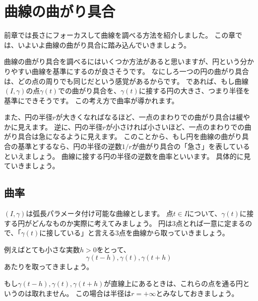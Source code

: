 \chapter{曲線の曲がり具合}

前章では長さにフォーカスして曲線を調べる方法を紹介しました。
この章では、いよいよ曲線の曲がり具合に踏み込んでいきましょう。

曲線の曲がり具合を調べるにはいくつか方法があると思いますが、円という分かりやすい曲線を基準にするのが良さそうです。
なにしろ一つの円の曲がり具合は、どの点の周りでも同じだという感覚があるからです。
であれば、もし曲線$(I,\gamma)$の点$\gamma(t)$での曲がり具合を、$\gamma(t)$に接する円の大きさ、つまり半径を基準にできそうです。
この考え方で曲率が導かれます。

また、円の半径$r$が大きくなればなるほど、一点のまわりでの曲がり具合は緩やかに見えます。
逆に、円の半径$r$が小さければ小さいほど、一点のまわりでの曲がり具合は急になるように見えます。
このことから、もし円を曲線の曲がり具合の基準とするなら、円の半径の逆数$1/r$が曲がり具合の「急さ」を表しているといえましょう。
曲線に接する円の半径の逆数を曲率といいます。
具体的に見ていきましょう。



\section{曲率}

$(I,\gamma)$は弧長パラメータ付け可能な曲線とします。
点$t\in I$について、$\gamma(t)$に接する円がどんなものか実際に考えてみましょう。
円は3点とれば一意に定まるので、「$\gamma(t)$に接している」と言える3点を曲線から取っていきましょう。

例えばとても小さな実数$h>0$をとって、
\[
  \gamma(t-h), \gamma(t), \gamma(t+h)
\]
あたりを取ってきましょう。

もし$\gamma(t-h), \gamma(t), \gamma(t+h)$が直線上にあるときは、これらの点を通る円というのは取れません。
この場合は半径は$r=+\infty$とみなしておきましょう。

